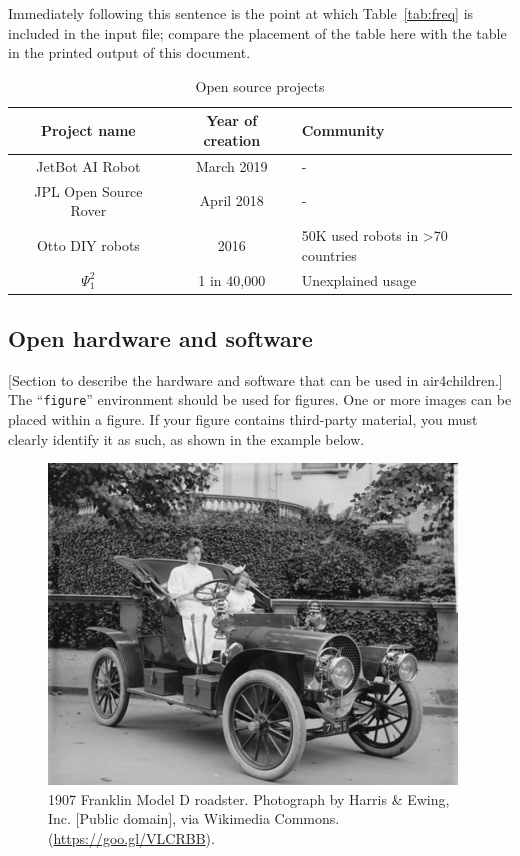 \documentclass[sigconf]{acmart}
\begin{document}
Immediately following this sentence is the point at which
Table~\ref{tab:freq} is included in the input file; compare the
placement of the table here with the table in the printed output of
this document.

\begin{table}
  \caption{Open source projects}
  \label{tab:opensourceprojects}
  \begin{tabular}{ccl}
    \toprule
    Project name& Year of creation & Community\\
    \midrule
    JetBot AI Robot \cite{nanoJetBot:2019} & March 2019 & - \\
    JPL Open Source Rover \cite{OSR:2018} & April 2018 & - \\
    Otto DIY robots \cite{OttoDIY:2016} & 2016 & 50K used robots in >70 countries\\
    $\Psi^2_1$ & 1 in 40,000& Unexplained usage\\
  \bottomrule
\end{tabular}
\end{table}


\subsection{Open hardware and software}
[Section to describe the hardware and software that can be used in 
air4children.]
The ``\verb|figure|'' environment should be used for figures. One or
more images can be placed within a figure. If your figure contains
third-party material, you must clearly identify it as such, as shown
in the example below.
\begin{figure}[h]
  \centering
  \includegraphics[width=\linewidth]{sample-franklin}
  \caption{1907 Franklin Model D roadster. Photograph by Harris \&
    Ewing, Inc. [Public domain], via Wikimedia
    Commons. (\url{https://goo.gl/VLCRBB}).}
\end{figure}
\end{document}
